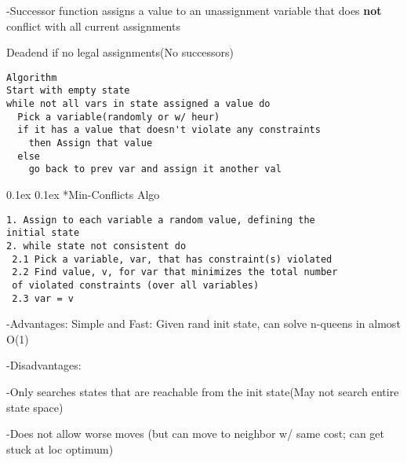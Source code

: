 \documentclass[10pt,landscape]{article}
\makeatletter
\renewcommand{\subsection}{\@startsection{subsection}{2}{0mm}%
                                {0.1ex}%
                                {0.1ex}%
                                {\normalfont\footnotesize\bfseries}}
\makeatother
\begin{document}
\begin{multicols}{3}
-Successor function assigns a value to an unassignment variable that does \textbf{not} conflict with all current assignments 

\quad Deadend if no legal assignments(No successors)
\linespread{0}
\begin{verbatim}
Algorithm
Start with empty state
while not all vars in state assigned a value do
  Pick a variable(randomly or w/ heur)
  if it has a value that doesn't violate any constraints
    then Assign that value
  else
    go back to prev var and assign it another val
\end{verbatim}


\subsection{*Min-Conflicts Algo}
\begin{verbatim}
1. Assign to each variable a random value, defining the 
initial state
2. while state not consistent do
 2.1 Pick a variable, var, that has constraint(s) violated
 2.2 Find value, v, for var that minimizes the total number 
 of violated constraints (over all variables)
 2.3 var = v
\end{verbatim}

-Advantages:
Simple and Fast: Given rand init state, can solve n-queens in almost O(1)

-Disadvantages:

\quad -Only searches states that are reachable from the init state(May not search entire state space)

\quad -Does not allow worse moves (but can move to neighbor w/ same cost; can get stuck at loc optimum)


\end{multicols}
\end{document}
